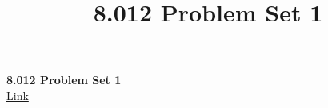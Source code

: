 \documentclass[tikz, 12pt,twoside]{article}
\title{8.012 Problem Set 1}
\begin{document}
\delimitershortfall=-1pt

\centering
\textbf{8.012 Problem Set 1} \\
\href{https://ocw.mit.edu/courses/physics/8-012-physics-i-classical-mechanics-fall-2008/assignments/ps1.pdf}{Link}
\centering

\setlength{\parindent}{0pt}

\medskip

\hrulefill






\end{document}
